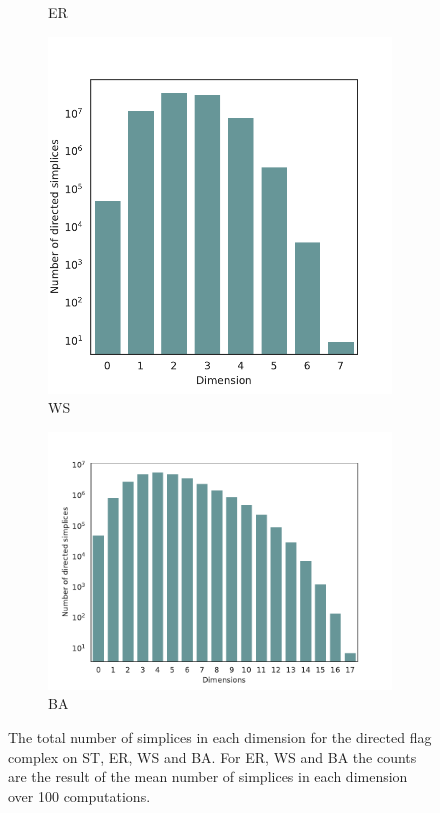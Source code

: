 \documentclass[oneside,a4paper,12pt, DIV=calc]{scrbook}
\theoremstyle{definition}
\begin{document}
\begin{figure}[ht]
\begin{subfigure}{.49 \linewidth}
    \caption{ER}
  \end{subfigure}
  \begin{subfigure}{.45 \linewidth}
    \includegraphics[scale=0.45]{./counts/random50k_ws_count.pdf}
    \caption{WS}
  \end{subfigure}
  \begin{subfigure}{.49 \linewidth}
    \includegraphics[scale=0.45]{./counts/random50k_ba_count.pdf}
    \caption{BA}
  \end{subfigure}
  \caption{\label{count50k}The total number of simplices in each dimension for the directed flag complex on ST, ER, WS and BA. For ER, WS and BA the counts are the result of the mean number of simplices in each dimension over 100 computations.}
\end{figure}
\end{document}
